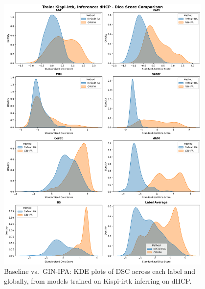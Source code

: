 \begin{figure}[htbp]
  \centering
  \includegraphics[width=0.95\textwidth]{figures/1_irtk-dhcp_DC.png}
  \caption{Baseline vs.\ GIN-IPA: KDE plots of DSC across each label and globally, from models trained on Kispi-irtk inferring on dHCP.}
  \label{fig:1_irtk_dhcp_DC}
\end{figure}

